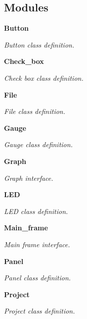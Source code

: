 \subsection*{Modules}
\begin{DoxyCompactItemize}
\item 
\textbf{ Button}
\begin{DoxyCompactList}\small\item\em Button class definition. \end{DoxyCompactList}\item 
\textbf{ Check\+\_\+box}
\begin{DoxyCompactList}\small\item\em Check box class definition. \end{DoxyCompactList}\item 
\textbf{ File}
\begin{DoxyCompactList}\small\item\em File class definition. \end{DoxyCompactList}\item 
\textbf{ Gauge}
\begin{DoxyCompactList}\small\item\em Gauge class definition. \end{DoxyCompactList}\item 
\textbf{ Graph}
\begin{DoxyCompactList}\small\item\em Graph interface. \end{DoxyCompactList}\item 
\textbf{ L\+ED}
\begin{DoxyCompactList}\small\item\em L\+ED class definition. \end{DoxyCompactList}\item 
\textbf{ Main\+\_\+frame}
\begin{DoxyCompactList}\small\item\em Main frame interface. \end{DoxyCompactList}\item 
\textbf{ Panel}
\begin{DoxyCompactList}\small\item\em Panel class definition. \end{DoxyCompactList}\item 
\textbf{ Project}
\begin{DoxyCompactList}\small\item\em Project class definition. \end{DoxyCompactList}\item 

\end{DoxyCompactItemize}
